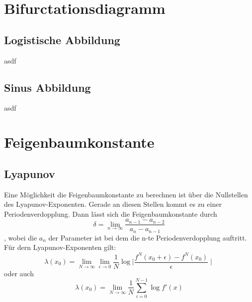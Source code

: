 \documentclass{scrartcl}
\begin{document}
\section { Bifurctationsdiagramm}
\subsection { Logistische Abbildung }
asdf
\subsection { Sinus Abbildung }
asdf
\section{ Feigenbaumkonstante}
\subsection {Lyapunov}
Eine Möglichkeit die Feigenbaumkonstante zu berechnen ist über die Nullstellen des Lyapunov-Exponenten. Gerade an diesen Stellen kommt es zu einer Periodenverdopplung. Dann lässt sich die Feigenbaumkonstante durch
$$\delta = \lim_{n \rightarrow \infty}\frac{a_{n-1}-a_{n-2}}{a_n-a_{n-1}}$$
, wobei die $a_n$ der Parameter ist bei dem die n-te Periodenverdopplung auftritt.
\newline
Für dern Lyapunov-Exponenten gilt:
$$\lambda(x_0) = \lim_{N \rightarrow \infty}\lim_{\epsilon \rightarrow 0} \frac{1}{N}\log{\mid \frac{f^N(x_0+\epsilon)- f^N(x_0)}{\epsilon} \mid} $$
oder auch
$$\lambda(x_0) = \lim_{N \rightarrow \infty} \frac{1}{N} \sum_{i=0}^{N-1}  \log{f'(x)} $$
\end{document}
